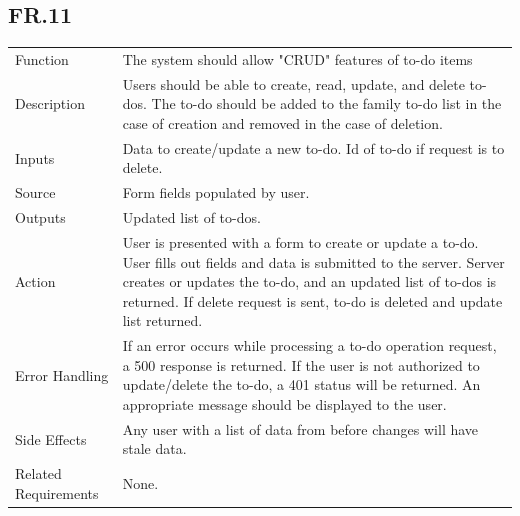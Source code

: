 \documentclass[12pt]{article}
\begin{document}
    \subsection*{FR.11}
    \begin{center}
        \begin{tabular}{| p{10em} p{26em} |}
        \hline
         Function & The system should allow "CRUD" features of to-do items\\
         Description & Users should be able to create, read, update, and delete to-dos. The to-do should be added to the family to-do list in the case of creation and removed in the case of deletion.\\
         Inputs & Data to create/update a new to-do. Id of to-do if request is to delete.\\
         Source & Form fields populated by user.\\
         Outputs & Updated list of to-dos.\\
         Action & User is presented with a form to create or update a to-do. User fills out fields and data is submitted to the server. Server creates or updates the to-do, and an updated list of to-dos is returned. If delete request is sent, to-do is deleted and update list returned.\\
         Error Handling & If an error occurs while processing a to-do operation request, a 500 response is returned. If the user is not authorized to update/delete the to-do, a 401 status will be returned. An appropriate message should be displayed to the user.\\
         Side Effects & Any user with a list of data from before changes will have stale data.\\
         Related Requirements & None.\\
         \hline
        \end{tabular}
    \end{center}
\end{document}
